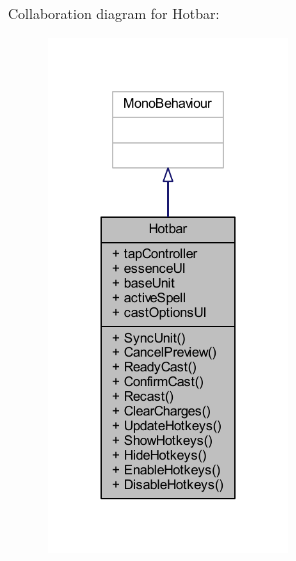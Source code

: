 Collaboration diagram for Hotbar\+:\nopagebreak
\begin{figure}[H]
\begin{center}
\leavevmode
\includegraphics[width=180pt]{class_hotbar__coll__graph}
\end{center}
\end{figure}
